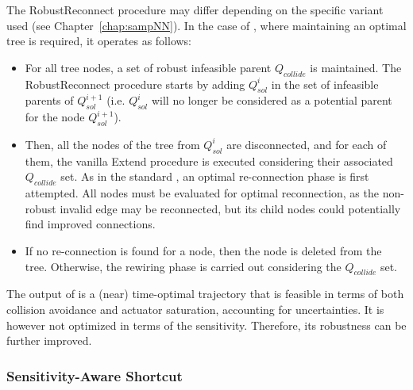 The RobustReconnect procedure may differ depending on the specific  variant used (see Chapter~\ref{chap:sampNN}). 
In the case of , where maintaining an optimal tree is required, it operates as follows:
\begin{itemize}
    \item For all tree nodes, a set of robust infeasible parent $Q_{collide}$ is maintained. 
    The RobustReconnect procedure starts by adding $Q_{sol}^i$ in the set of infeasible parents of $Q_{sol}^{i+1}$ (i.e. $Q_{sol}^i$ will no longer be considered as a potential parent for the node $Q_{sol}^{i+1}$).
    \item Then, all the nodes of the tree from $Q_{sol}^i$ are disconnected, and for each of them, the vanilla Extend procedure is executed considering their associated $Q_{collide}$ set.
    As in the standard , an optimal re-connection phase is first attempted.
    All nodes must be evaluated for optimal reconnection, as the non-robust invalid edge may be reconnected, but its child nodes could potentially find improved connections.
    \item If no re-connection is found for a node, then the node is deleted from the tree. 
    Otherwise, the rewiring phase is carried out considering the $Q_{collide}$ set.
\end{itemize}

The output of  is a (near) time-optimal trajectory that is feasible in terms of both collision avoidance and actuator saturation, accounting for uncertainties.
It is however not optimized in terms of the sensitivity. 
Therefore, its robustness can be further improved.

\subsubsection{Sensitivity-Aware Shortcut}

